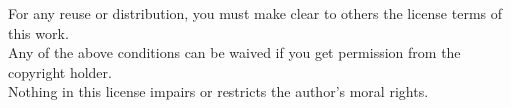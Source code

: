 \documentclass[12pt,leqno]{book}
\begin{document}
\noindent
For any reuse or distribution, you must make clear to others the license terms of this work.\\

\noindent
Any of the above conditions can be waived if you get permission from the copyright holder.\\

\noindent
Nothing in this license impairs or restricts the author's moral rights.\\

\mainmatter

\pagestyle{plain}

\tableofcontents



\pagestyle{headings}












\appendix





\printindex
\end{document}
